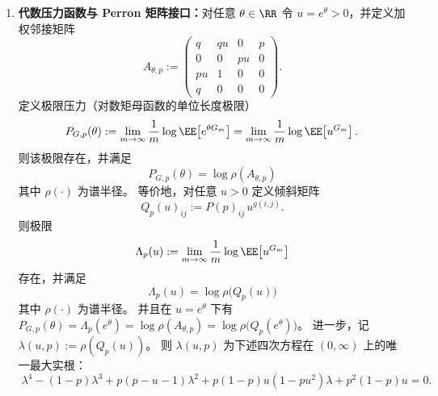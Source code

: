 \begin{theorem}
\begin{enumerate}
  \item \textbf{代数压力函数与 Perron 矩阵接口：}对任意 \(\theta\in\RR\) 令 \(u=e^{\theta}>0\)，并定义加权邻接矩阵
  \[
  A_{\theta,p}:=
  \begin{pmatrix}
  q & qu & 0 & p\\
  0 & 0 & pu & 0\\
  pu & 1 & 0 & 0\\
  q & 0 & 0 & 0
  \end{pmatrix}.
  \]
  定义极限压力（对数矩母函数的单位长度极限）
  \[
  P_{G,p}(\theta):=\lim_{m\to\infty}\frac{1}{m}\log\EE\!\left[e^{\theta G_m}\right]
  =\lim_{m\to\infty}\frac{1}{m}\log\EE\!\left[u^{G_m}\right].
  \]
  则该极限存在，并满足
  \[
  \boxed{\;P_{G,p}(\theta)=\log\rho(A_{\theta,p})\;}
  \]
  其中 \(\rho(\cdot)\) 为谱半径。
  等价地，对任意 \(u>0\) 定义倾斜矩阵
  \[
  Q_p(u)_{ij}:=P(p)_{ij}\,u^{g(i,j)}.
  \]
  则极限
  \[
  \Lambda_p(u):=\lim_{m\to\infty}\frac{1}{m}\log\EE\bigl[u^{G_m}\bigr]
  \]
  存在，并满足
  \[
  \boxed{\;\Lambda_p(u)=\log\rho\!\bigl(Q_p(u)\bigr)\;}
  \]
  其中 \(\rho(\cdot)\) 为谱半径。
  并且在 \(u=e^\theta\) 下有
  \(
  P_{G,p}(\theta)=\Lambda_p(e^\theta)=\log\rho(A_{\theta,p})=\log\rho\!\bigl(Q_p(e^\theta)\bigr)
  \)。
  进一步，记 \(\lambda(u,p):=\rho(Q_p(u))\)。
  则 \(\lambda(u,p)\) 为下述四次方程在 \((0,\infty)\) 上的唯一最大实根：
  \begin{equation}\label{eq:fold-gauge-anomaly-bernoulli-p-pressure-quartic}
  \boxed{\;
  \lambda^4-(1-p)\lambda^3+p(p-u-1)\lambda^2
  +p(1-p)u(1-pu^2)\lambda+p^2(1-p)u=0.\;}
  \end{equation}
\end{enumerate}
\end{theorem}
